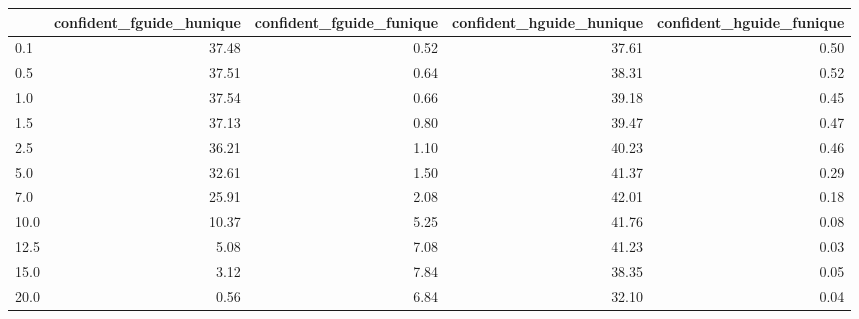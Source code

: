 \begin{tabular}{lrrrr}
\toprule
 & confident_fguide_hunique & confident_fguide_funique & confident_hguide_hunique & confident_hguide_funique \\
\midrule
0.1 & 37.48 & 0.52 & 37.61 & 0.50 \\
0.5 & 37.51 & 0.64 & 38.31 & 0.52 \\
1.0 & 37.54 & 0.66 & 39.18 & 0.45 \\
1.5 & 37.13 & 0.80 & 39.47 & 0.47 \\
2.5 & 36.21 & 1.10 & 40.23 & 0.46 \\
5.0 & 32.61 & 1.50 & 41.37 & 0.29 \\
7.0 & 25.91 & 2.08 & 42.01 & 0.18 \\
10.0 & 10.37 & 5.25 & 41.76 & 0.08 \\
12.5 & 5.08 & 7.08 & 41.23 & 0.03 \\
15.0 & 3.12 & 7.84 & 38.35 & 0.05 \\
20.0 & 0.56 & 6.84 & 32.10 & 0.04 \\
\bottomrule
\end{tabular}
